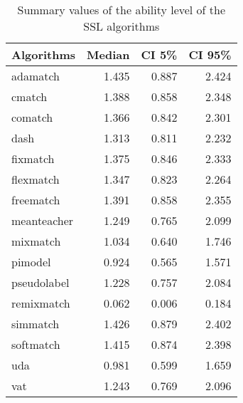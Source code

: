 \begin{table}[!h]

\caption{\label{tab:posterior-ability}Summary values of the ability level of the SSL algorithms}
\centering
\begin{tabular}[t]{lrrr}
\toprule
Algorithms & Median & CI 5\% & CI 95\%\\
\midrule
adamatch & 1.435 & 0.887 & 2.424\\
cmatch & 1.388 & 0.858 & 2.348\\
comatch & 1.366 & 0.842 & 2.301\\
dash & 1.313 & 0.811 & 2.232\\
fixmatch & 1.375 & 0.846 & 2.333\\
flexmatch & 1.347 & 0.823 & 2.264\\
freematch & 1.391 & 0.858 & 2.355\\
meanteacher & 1.249 & 0.765 & 2.099\\
mixmatch & 1.034 & 0.640 & 1.746\\
pimodel & 0.924 & 0.565 & 1.571\\
pseudolabel & 1.228 & 0.757 & 2.084\\
remixmatch & 0.062 & 0.006 & 0.184\\
simmatch & 1.426 & 0.879 & 2.402\\
softmatch & 1.415 & 0.874 & 2.398\\
uda & 0.981 & 0.599 & 1.659\\
vat & 1.243 & 0.769 & 2.096\\
\bottomrule
\end{tabular}
\end{table}
